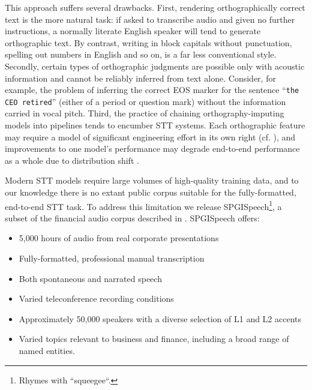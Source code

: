 \documentclass{article}
\newcommand{\corpus}{SPGISpeech}
\begin{document}
This approach suffers several drawbacks.  First, rendering orthographically correct text is the more
natural task: if asked to transcribe audio and given no further
instructions, a normally literate English speaker 
will tend to generate orthographic text.  By contrast, writing in block capitals
without punctuation, spelling out numbers in English and so on, is a
far less conventional style.  Secondly, certain types of orthographic
judgments are possible only with acoustic information and cannot be
reliably inferred from text alone. Consider, for example, the problem
of inferring the correct EOS marker for the sentence ``\texttt{the CEO retired}'' (either of a period or question mark) without the information carried in vocal pitch. Third, the practice of chaining orthography-imputing models into pipelines tends to encumber STT systems.  Each orthographic feature may require a model of significant engineering effort in its own right (cf. \cite{sproat16, salloum17, pusateri17, nguyen19, hrinchuk20, sunkara21}), and improvements to one model's performance may degrade end-to-end performance as a whole due to distribution shift \cite{sculley15}.


Modern STT models require large volumes of high-quality training data,
and to our knowledge there is no extant public corpus suitable for the
fully-formatted, end-to-end STT task.  To address this limitation we
release \corpus\footnote{Rhymes with ``squeegee``.}, a subset of the financial audio corpus described
in \cite{huang20}.  \corpus{} offers: 

\begin{itemize}
\item 5,000 hours of audio from real corporate presentations
\item Fully-formatted, professional manual transcription
\item Both spontaneous and narrated speech
\item Varied teleconference recording conditions
\item Approximately 50,000 speakers with a diverse selection of L1 and L2 accents
\item Varied topics relevant to business and finance, including a broad range of named entities.
\end{itemize}
\end{document}

